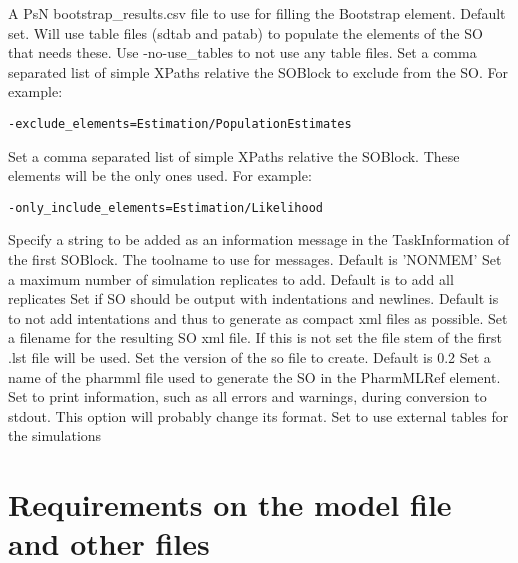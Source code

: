 \begin{optionlist}
A PsN bootstrap\_results.csv file to use for filling the Bootstrap element.
\nextopt
{}
Default set. Will use table files (sdtab and patab) to populate the elements of the SO that needs these. Use -no-use\_tables to not use any table files.
\nextopt
{}
Set a comma separated list of simple XPaths relative the SOBlock to exclude from the SO.
For example:
\begin{verbatim}
-exclude_elements=Estimation/PopulationEstimates
\end{verbatim}
\nextopt
{}
Set a comma separated list of simple XPaths relative the SOBlock. These elements will be the only ones used.
For example: 
\begin{verbatim}
-only_include_elements=Estimation/Likelihood
\end{verbatim}
\nextopt
{}
Specify a string to be added as an information message in the TaskInformation of the first SOBlock.
\nextopt
{}
The toolname to use for messages. Default is 'NONMEM'
\nextopt
{}
Set a maximum number of simulation replicates to add. Default is to add all replicates
\nextopt
{}
Set if SO should be output with indentations and newlines.
Default is to not add intentations and thus to generate as compact xml files as possible.
\nextopt
{}
Set a filename for the resulting SO xml file. If this is not set the file stem of the first .lst file will be used.
\nextopt
{}
Set the version of the so file to create. Default is 0.2
\nextopt
{}
Set a name of the pharmml file used to generate the SO
in the PharmMLRef element.
\nextopt
{}
Set to print information, such as all errors and warnings, during conversion to stdout.
\nextopt
{}
This option will probably change its format.
Set to use external tables for the simulations
\nextopt
\end{optionlist}

\section{Requirements on the model file and other files}

